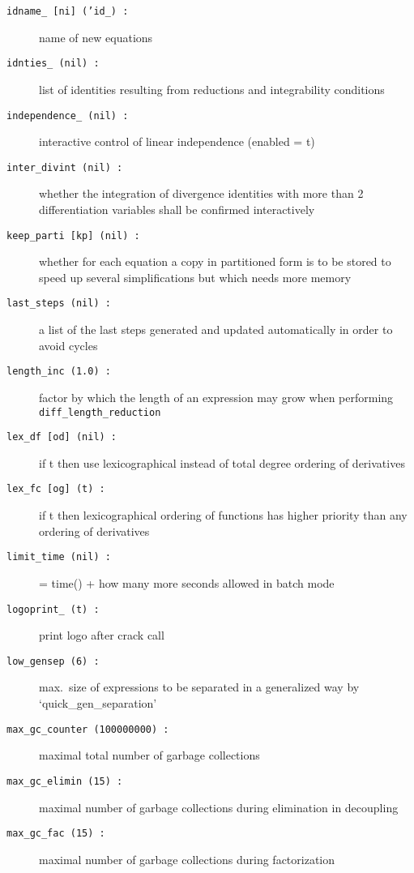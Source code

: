 \documentclass[12pt]{article}
\begin{document}
\begin{description}
\item[{\tt idname\_ [ni] ('id\_) :}] name of new equations
\item[{\tt idnties\_ (nil) :}] list of identities resulting from reductions and
                    integrability conditions
\item[{\tt independence\_ (nil) :}] interactive control of linear
                                    independence (enabled = t)
\item[{\tt inter\_divint (nil) :}] whether the integration of divergence
                   identities with more than 2 differentiation variables
                   shall be confirmed interactively
\item[{\tt keep\_parti [kp] (nil) :}] whether for each equation a copy
                    in partitioned form is to be stored to speed up
                    several simplifications but which needs more memory
\item[{\tt last\_steps (nil) :}] a list of the last steps generated and updated
                   automatically in order to avoid cycles
\item[{\tt length\_inc (1.0) :}] factor by which the length of an
                    expression may grow when performing
                    {\tt diff\_length\_reduction}
\item[{\tt lex\_df [od] (nil) :}] if t then use lexicographical
                    instead of total degree ordering of derivatives
\item[{\tt lex\_fc [og] (t) :}] if t then lexicographical ordering of
                    functions has higher priority than any ordering of
                    derivatives
\item[{\tt limit\_time (nil) :}] = time() + how many more seconds allowed in batch mode
\item[{\tt logoprint\_ (t) :}] print logo after crack call
\item[{\tt low\_gensep (6) :}] max.\ size of expressions to be separated in a
                    generalized way by \\ `quick\_gen\_separation'
\item[{\tt max\_gc\_counter (100000000) :}] maximal total number of garbage collections
\item[{\tt max\_gc\_elimin (15) :}] maximal number of garbage collections during
                    elimination in decoupling
\item[{\tt max\_gc\_fac (15) :}] maximal number of garbage collections during factorization

\end{description}
\end{document}
